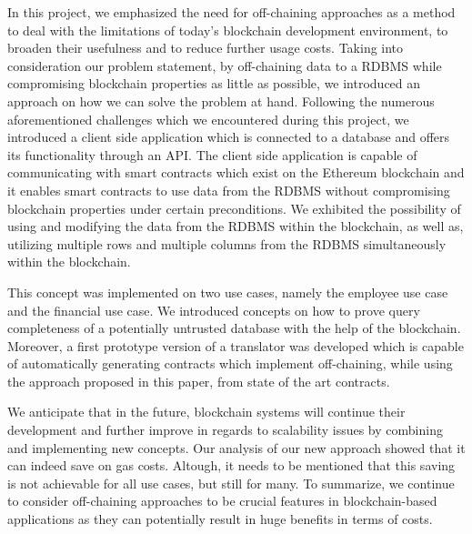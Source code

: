 
In this project, we emphasized the need for off-chaining approaches as a method to deal with the limitations of today’s blockchain development environment, to broaden their usefulness and to reduce further usage costs. 
Taking into consideration our problem statement, by off-chaining data to a RDBMS while compromising blockchain properties as little as possible, we introduced an approach on how we can solve the problem at hand.
Following the numerous aforementioned challenges which we encountered during this project, we introduced a client side application which is connected to a database and offers its functionality through an API.
The client side application is capable of communicating with smart contracts which exist on the Ethereum blockchain and it enables smart contracts to use data from the RDBMS without compromising blockchain properties under certain preconditions. 
We exhibited the possibility of using and modifying the data from the RDBMS within the blockchain, as well as, utilizing multiple rows and multiple columns from the RDBMS simultaneously within the blockchain.

This concept was implemented on two use cases, namely the employee use case and the financial use case.
We introduced concepts on how to prove query completeness of a potentially untrusted database with the help of the blockchain.
Moreover, a first prototype version of a translator was developed which is capable of automatically generating contracts which implement off-chaining, while using the approach proposed in this paper, from state of the art contracts.


We anticipate that in the future, blockchain systems will continue their development and further improve in regards to scalability issues by combining and implementing new concepts. 
Our analysis of our new approach showed that it can indeed save on gas costs.
Altough, it needs to be mentioned that this saving is not achievable for all use cases, but still for many.
To summarize, we continue to consider off-chaining approaches to be crucial features in blockchain-based applications as they can potentially result in huge benefits in terms of costs.





